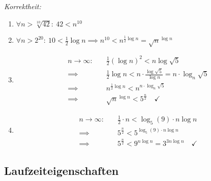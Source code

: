 \emph{Korrektheit:}

\begin{enumerate}[label=\protect\circled{\arabic*}]
	\item $\forall n > \sqrt[10]{42}:\ 42 < n^{10}$ \checkmark
	\item $\forall n > 2^{20}:\ 10 < \frac{1}{2}\log{n} \implies n^{10} < n^{\frac{1}{2}\log{n}} = \sqrt{n}^{\log{n}}$ \checkmark
	\item \begin{equation*}
			\begin{align}
				n \to \infty:\quad
				&\frac{1}{2}(\log{n})^2 < n\log{\sqrt{5}}\\
				\implies &\frac{1}{2}\log{n} < n \cdot \frac{\log{\sqrt{5}}}{\log{n}} = n \cdot \log_n{\sqrt{5}}\\
				\implies &n^{\frac{1}{2}\log{n}} < n^{n \cdot \log_n{\sqrt{5}}}\\
				\implies &\sqrt{n}^{\log{n}} < 5^{\frac{n}{2}}\quad\checkmark
			\end{align}
		\end{equation*}
	\item \begin{equation*}
		\begin{align}
			n \to \infty:\quad
			&\frac{1}{2} \cdot n < \log_{5}{(9)} \cdot n \log{n}\\
			\implies &5^{\frac{n}{2}} < 5^{\log_{5}{(9)} \cdot n \log{n}}\\
			\implies &5^{\frac{n}{2}} < 9^{n \log{n}} = 3^{3n\log{n}}\quad\checkmark
		\end{align}
	\end{equation*}
\end{enumerate}

\subsection{Laufzeiteigenschaften}

